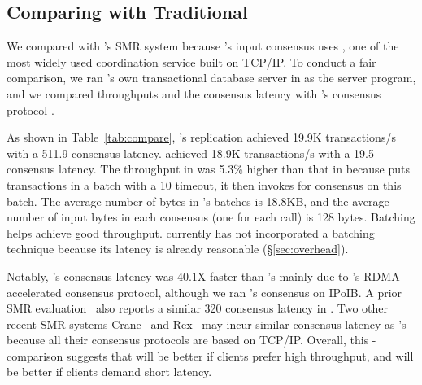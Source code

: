 \subsection{Comparing with Traditional \paxos}
\label{sec:eval-traditional}

We compared \xxx with \calvin's SMR system because \calvin's input consensus
uses \zookeeper, one of the most widely used coordination service built on
TCP/IP. To conduct a fair comparison, we ran \calvin's own transactional
database server in \xxx as the server program, and we compared throughputs and
the consensus latency with \calvin's consensus protocol \zookeeper.

As shown in Table~\ref{tab:compare}, \calvin's \zookeeper replication achieved
19.9K transactions/s with a 511.9 \us consensus latency. \xxx achieved 18.9K
transactions/s with a 19.5 \us consensus latency. The throughput in \calvin
was 5.3\% higher than that in \xxx because \calvin puts transactions in a
batch with a 10 \ms timeout, it then invokes \zookeeper for consensus on
this batch. The average number of bytes in \calvin's batches is 18.8KB, and
the average number of input bytes in each \xxx consensus (one for each \myread
call) is 128 bytes. Batching helps \calvin achieve good throughput. \xxx
currently has not incorporated a batching technique because its latency is
already reasonable (\S\ref{sec:overhead}).

Notably, \xxx's consensus latency was 40.1X faster than \zookeeper's mainly due
to \xxx's RDMA-accelerated consensus protocol, although we ran \calvin's
\zookeeper consensus on IPoIB. A prior SMR evaluation~\cite{dare:hpdc15} also
reports a similar 320 \us consensus latency in \zookeeper. Two other recent SMR
systems Crane~\cite{crane:sosp15} and Rex~\cite{rex:eurosys14} may incur
similar
consensus latency as \zookeeper's because all their consensus protocols are
based on TCP/IP. Overall, this \xxx-\calvin comparison suggests that \calvin
will be better if clients prefer high throughput, and \xxx will be better if
clients demand short latency.

